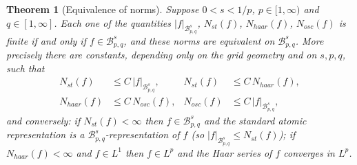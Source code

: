 \documentclass[11pt]{amsart}
\newtheorem{theorem}{Theorem}[section]
\theoremstyle{definition}
\begin{document}
\begin{theorem}[Equivalence of norms]\label{alte}
Suppose $0<s<1/p$, $p\in [1,\infty)$ and $q\in [1,\infty]$. Each one of the
quantities $|f|_{\mathcal{B}^s_{p,q}}$, $N_{st}(f)$, $N_{haar}(f)$,
$N_{osc}(f)$ is finite if and only if $f\in \mathcal{B}^s_{p,q}$, and these
norms are equivalent on $\mathcal{B}^s_{p,q}$. More precisely there are
constants, depending only on the grid geometry and on $s,p,q$, such that
\begin{align*}
N_{st}(f) &\leq C\, |f|_{\mathcal{B}^s_{p,q}}, &
N_{st}(f) &\leq C\, N_{haar}(f),\\
N_{haar}(f) &\leq C\, N_{osc}(f), &
N_{osc}(f) &\leq C\, |f|_{\mathcal{B}^s_{p,q}},
\end{align*}
and conversely: if $N_{st}(f)<\infty$ then $f \in \mathcal{B}^s_{p,q}$ and
the standard atomic representation is a
$\mathcal{B}^s_{p,q}$-representation of $f$ (so
$|f|_{\mathcal{B}^s_{p,q}} \leq N_{st}(f)$); if $N_{haar}(f) < \infty$ and
$f \in L^1$ then $f \in L^p$ and the Haar series of $f$ converges in
$L^p$.
\end{theorem}
\end{document}
